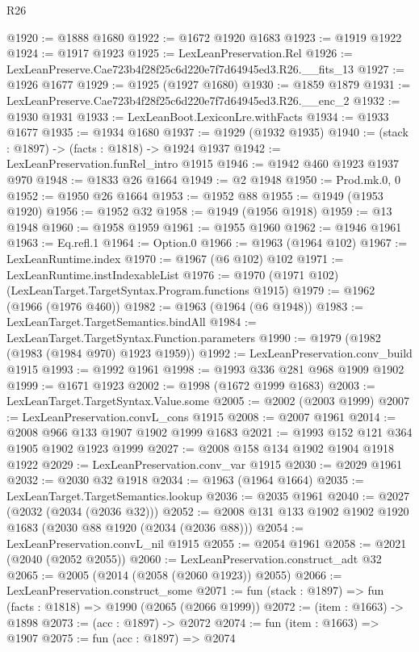 \begin{lexlean}{R26}
\begin{coremodule}
@1920 := @1888 @1680
@1922 := @1672 @1920 @1683
@1923 := @1919 @1922
@1924 := @1917 @1923
@1925 := LexLeanPreservation.Rel
@1926 := LexLeanPreserve.Cae723b4f28f25c6d220e7f7d64945ed3.R26.__fits_13
@1927 := @1926 @1677
@1929 := @1925 (@1927 @1680)
@1930 := @1859 @1879
@1931 := LexLeanPreserve.Cae723b4f28f25c6d220e7f7d64945ed3.R26.__enc_2
@1932 := @1930 @1931
@1933 := LexLeanBoot.LexiconLre.withFacts
@1934 := @1933 @1677
@1935 := @1934 @1680
@1937 := @1929 (@1932 @1935)
@1940 := (stack : @1897) -> (facts : @1818) -> @1924 @1937
@1942 := LexLeanPreservation.funRel_intro @1915
@1946 := @1942 @460 @1923 @1937 @970
@1948 := @1833 @26 @1664
@1949 := @2 @1948
@1950 := Prod.mk.{0, 0}
@1952 := @1950 @26 @1664
@1953 := @1952 @88
@1955 := @1949 (@1953 @1920)
@1956 := @1952 @32
@1958 := @1949 (@1956 @1918)
@1959 := @13 @1948
@1960 := @1958 @1959
@1961 := @1955 @1960
@1962 := @1946 @1961
@1963 := Eq.refl.{1}
@1964 := Option.{0}
@1966 := @1963 (@1964 @102)
@1967 := LexLeanRuntime.index
@1970 := @1967 (@6 @102) @102
@1971 := LexLeanRuntime.instIndexableList
@1976 := @1970 (@1971 @102) (LexLeanTarget.TargetSyntax.Program.functions @1915)
@1979 := @1962 (@1966 (@1976 @460))
@1982 := @1963 (@1964 (@6 @1948))
@1983 := LexLeanTarget.TargetSemantics.bindAll
@1984 := LexLeanTarget.TargetSyntax.Function.parameters
@1990 := @1979 (@1982 (@1983 (@1984 @970) @1923 @1959))
@1992 := LexLeanPreservation.conv_build @1915
@1993 := @1992 @1961
@1998 := @1993 @336 @281 @968 @1909 @1902
@1999 := @1671 @1923
@2002 := @1998 (@1672 @1999 @1683)
@2003 := LexLeanTarget.TargetSyntax.Value.some
@2005 := @2002 (@2003 @1999)
@2007 := LexLeanPreservation.convL_cons @1915
@2008 := @2007 @1961
@2014 := @2008 @966 @133 @1907 @1902 @1999 @1683
@2021 := @1993 @152 @121 @364 @1905 @1902 @1923 @1999
@2027 := @2008 @158 @134 @1902 @1904 @1918 @1922
@2029 := LexLeanPreservation.conv_var @1915
@2030 := @2029 @1961
@2032 := @2030 @32 @1918
@2034 := @1963 (@1964 @1664)
@2035 := LexLeanTarget.TargetSemantics.lookup
@2036 := @2035 @1961
@2040 := @2027 (@2032 (@2034 (@2036 @32)))
@2052 := @2008 @131 @133 @1902 @1902 @1920 @1683 (@2030 @88 @1920 (@2034 (@2036 @88)))
@2054 := LexLeanPreservation.convL_nil @1915
@2055 := @2054 @1961
@2058 := @2021 (@2040 (@2052 @2055))
@2060 := LexLeanPreservation.construct_adt @32
@2065 := @2005 (@2014 (@2058 (@2060 @1923)) @2055)
@2066 := LexLeanPreservation.construct_some
@2071 := fun (stack : @1897) => fun (facts : @1818) => @1990 (@2065 (@2066 @1999))
@2072 := (item : @1663) -> @1898
@2073 := (acc : @1897) -> @2072
@2074 := fun (item : @1663) => @1907
@2075 := fun (acc : @1897) => @2074

\end{coremodule}
\end{lexlean}
